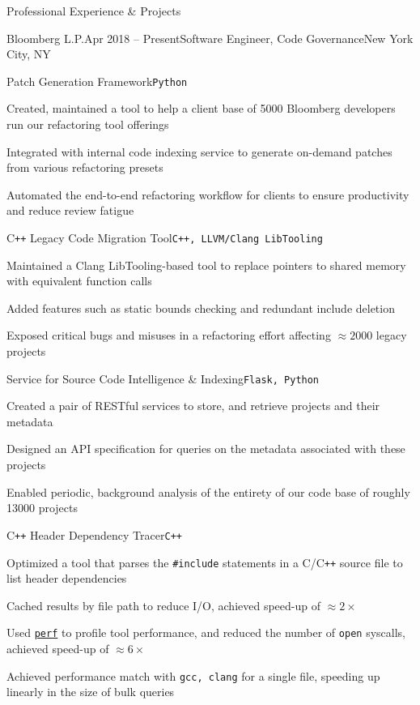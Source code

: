 \begin{rSection}{Professional Experience \& Projects}

\begin{workEx}{Bloomberg L.P.}{Apr 2018 -- Present}{Software Engineer, Code Governance}{New York City, NY}

%
%
\begin{project}{Patch Generation Framework}{\texttt{Python}}
\item Created, maintained a tool to help a client base of 5000 Bloomberg developers run our refactoring tool offerings
\item Integrated with internal code indexing service to generate on-demand patches from various refactoring presets
\item Automated the end-to-end refactoring workflow for clients to ensure productivity and reduce review fatigue
\end{project}

%
%
\begin{project}{C\texttt{++} Legacy Code Migration Tool}{\texttt{C++, LLVM/Clang LibTooling}}
\item Maintained a Clang LibTooling-based tool to replace pointers to shared memory with equivalent function calls
\item Added features such as static bounds checking and redundant include deletion
\item Exposed critical bugs and misuses in a refactoring effort affecting $\approx 2000$ legacy projects
\end{project}

%
%
\begin{project}{Service for Source Code Intelligence \& Indexing}{\texttt{Flask, Python}}
\item Created a pair of RESTful services to store, and retrieve projects and their metadata 
\item Designed an API specification for queries on the metadata associated with these projects
\item Enabled periodic, background analysis of the entirety of our code base of roughly 13000 projects
\end{project}

%
%
\begin{project}{C\texttt{++} Header Dependency Tracer}{\texttt{C++}}
\item Optimized a tool that parses the \texttt{\#include} statements in a C/C\texttt{++} source file to list header dependencies
\item Cached results by file path to reduce I/O, achieved speed-up of $\approx2\times$
\item Used \href{https://perf.wiki.kernel.org/index.php/Main_Page}{\texttt{perf}} to profile tool performance, and reduced the number of \texttt{open} syscalls, achieved speed-up of $\approx6\times$
\item Achieved performance match with \texttt{gcc, clang} for a single file, speeding up linearly in the size of bulk queries
\end{project}


\end{workEx}
\end{rSection}
